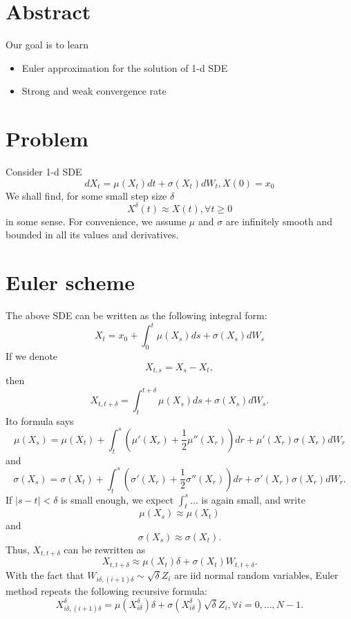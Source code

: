 \documentclass{article}
\begin{document}
\section{Abstract}
Our goal is to learn
\begin{itemize}
 \item Euler approximation for the solution of 1-d SDE
 \item Strong and weak convergence rate
\end{itemize}

\section{Problem}

Consider 1-d SDE 
$$d X_{t} = \mu(X_{t}) dt + \sigma(X_{t}) dW_{t}, X(0) = x_{0}$$
We shall find, for some small step size $\delta$
$$X^{\delta} (t) \approx X(t), \forall t\ge 0$$
in some sense.
For convenience, we assume $\mu$ and $\sigma$ are infinitely smooth and bounded in all its values and derivatives.


\section{Euler scheme}
The above SDE can be written as the following integral form:
$$
X_{t} = x_{0}  + \int_{0}^{t}  \mu(X_{s}) ds + \sigma(X_{s}) dW_{s}
$$
If we denote 
$$X_{t,s} = X_{s} - X_{t},$$
then 
$$X_{t,t+\delta} = \int_{t}^{t+\delta}  \mu(X_{s}) ds + \sigma(X_{s}) dW_{s}.$$
Ito formula says
$$
\mu(X_{s}) =
\mu(X_{t}) + \int_{t}^{s} (\mu'(X_{r}) + \frac 1 2 \mu''(X_{r})) dr + \mu'(X_{r}) \sigma(X_{r}) dW_{r}
$$
and
$$
\sigma(X_{s}) =
\sigma(X_{t}) + 
\int_{t}^{s} (\sigma'(X_{r}) + \frac 1 2 \sigma''(X_{r})) dr + \sigma'(X_{r}) \sigma(X_{r}) dW_{r}.
$$
If $|s - t| < \delta$ is small enough, we expect $\int_t^s ...$ is again small, and write
$$\mu(X_{s}) \approx \mu(X_{t}) $$
and 
$$\sigma(X_{s}) \approx \sigma(X_{t}) .$$
Thus, $X_{t, t+\delta}$ can be rewritten as
$$
X_{t, t+\delta} \approx \mu(X_{t}) \delta + \sigma(X_{t}) W_{t,t+\delta}.
$$
With the fact that $W_{i \delta, (i+1)\delta} \sim \sqrt \delta Z_{i}$ are iid normal random variables, 
Euler method repeats the following recursive formula:
$$
X^\delta_{i\delta, (i+1)\delta} =  \mu(X^\delta_{i\delta}) \delta + \sigma(X^{\delta}_{i\delta})  \sqrt \delta Z_{i}, \forall i=0, \ldots, N-1.
$$
\end{document}
